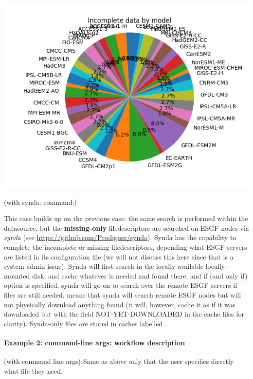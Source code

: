 \documentclass[letterpaper,10pt,english]{sphinxmanual}
\begin{document}
\includegraphics[scale=0.5]{incomplete}

(with synda: command:) 


This case builds up on the previous case: the same search is performed within the  datasource, but the \textbf{missing-only} filedescriptors are searched on ESGF nodes via \textsl{synda} (see \href{https://github.com/Prodiguer/synda}{https://github.com/Prodiguer/synda}). Synda has the capability to complete the incomplete or missing filedescriptors, depending what ESGF servers are listed in its configuration file (we will not discuss this here since that is a system admin issue). Synda will first search in the locally-available locally-mounted  disk, and cache whatever is needed and found there, and if (and only if)  option is specified, synda will go on to search over the remote ESGF servers if files are still needed.  means that synda will search remote ESGF nodes but will not physically download anything found (it will, however, cache it as if it was downloaded but with the field NOT-YET-DOWNLOADED in the cache files for clarity). Synda-only files are stored in caches labelled .


\paragraph{Example 2: command-line args: workflow description}
(with command line args) 
Same as above only that the user specifies directly what file they need.
\end{document}
